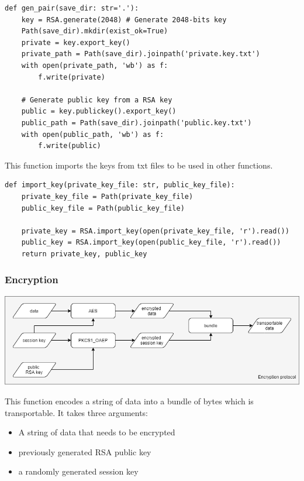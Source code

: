 \begin{verbatim}
def gen_pair(save_dir: str='.'):
    key = RSA.generate(2048) # Generate 2048-bits key
    Path(save_dir).mkdir(exist_ok=True)
    private = key.export_key()
    private_path = Path(save_dir).joinpath('private.key.txt')
    with open(private_path, 'wb') as f:
        f.write(private)

    # Generate public key from a RSA key
    public = key.publickey().export_key()
    public_path = Path(save_dir).joinpath('public.key.txt')
    with open(public_path, 'wb') as f:
        f.write(public)
\end{verbatim}

This function imports the keys from txt files to be used in other functions.
\begin{verbatim}
def import_key(private_key_file: str, public_key_file):
    private_key_file = Path(private_key_file)
    public_key_file = Path(public_key_file)

    private_key = RSA.import_key(open(private_key_file, 'r').read())
    public_key = RSA.import_key(open(public_key_file, 'r').read())
    return private_key, public_key

\end{verbatim}

\subsubsection{Encryption}

\begin{center}
    \includegraphics[scale=0.5]{images/encryption_protocol.png}
\end{center}

This function encodes a string of data into a bundle of bytes which is transportable. It takes three arguments:
\begin{itemize}
    \item A string of data that needs to be encrypted
    \item previously generated RSA public key
    \item a randomly generated session key
\end{itemize}

